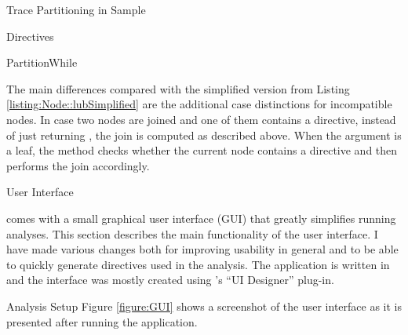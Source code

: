 \begin{chapter}{Trace Partitioning in Sample}
\begin{section}{Directives}
\begin{subsection}{PartitionWhile}
			

			The main differences compared with the simplified version from Listing \ref{listing:Node::lubSimplified} are the additional case distinctions for incompatible nodes. In case two nodes are joined and one of them contains a  directive, instead of just returning , the join is computed as described above. When the argument is a leaf, the method checks whether the current node contains a  directive and then performs the join accordingly.

		\end{subsection}
	\end{section}


	\begin{section}{User Interface}
		\label{section:UserInterface}

		\sample comes with a small graphical user interface (GUI) that greatly simplifies running analyses. This section describes the main functionality of the user interface. I have made various changes both for improving usability in general and to be able to quickly generate directives used in the analysis. The application is written in \java and the interface was mostly created using \intellij's ``UI Designer'' plug-in.


		\begin{subsection}{Analysis Setup}
			Figure \ref{figure:GUI} shows a screenshot of the user interface as it is presented after running the application. 


\end{subsection}
\end{section}
\end{chapter}
